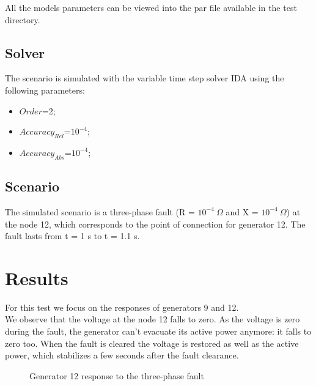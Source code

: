 \documentclass[a4paper, 12pt]{report}
\begin{document}
All the models parameters can be viewed into the par file available in the test directory.

\subsection{Solver}
The scenario is simulated with the variable time step solver IDA using the following parameters:
\begin{itemize}
\item $Order$=2;
\item $Accuracy_{Rel}$=$10^{-4}$;
\item $Accuracy_{Abs}$=$10^{-4}$;
\end{itemize}

\subsection{Scenario}
The simulated scenario is a three-phase fault (R = $10^{-4} \ \Omega$ and X = $10^{-4} \ \Omega$) at the node 12, which corresponds to the point of connection for generator 12. The fault lasts from t = 1 s to t = 1.1 s.

\newpage
\section{Results}

For this test we focus on the responses of generators 9 and 12.\\

We observe that the voltage at the node 12 falls to zero. As the voltage is zero during the fault, the generator can't evacuate its active power anymore: it falls to zero too. When the fault is cleared the voltage is restored as well as the active power, which stabilizes a few seconds after the fault clearance.\\

\begin{figure}[H]
\caption{Generator 12 response to the three-phase fault}
\end{figure}
\end{document}
